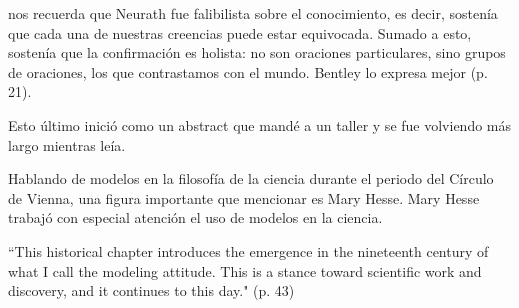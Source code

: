 \textcite{Bentley2023} nos recuerda que Neurath fue falibilista sobre el conocimiento, es decir,  sostenía que cada una de nuestras creencias puede estar equivocada.
Sumado a esto, sostenía que la confirmación es holista: no son oraciones particulares, sino grupos de oraciones, los que contrastamos con el mundo.
Bentley lo expresa mejor  (p. 21).



Esto último inició como un abstract que mandé a un taller y se fue volviendo más largo mientras leía.

Hablando de modelos en la filosofía de la ciencia durante el periodo del Círculo de Vienna, una figura importante que mencionar es Mary Hesse.
Mary Hesse trabajó con especial atención el uso de modelos en la ciencia.

``This historical chapter introduces the emergence in the nineteenth century of  what I call the modeling attitude.
This is a stance toward scientific work and  discovery, and it continues to this day." (p. 43)






